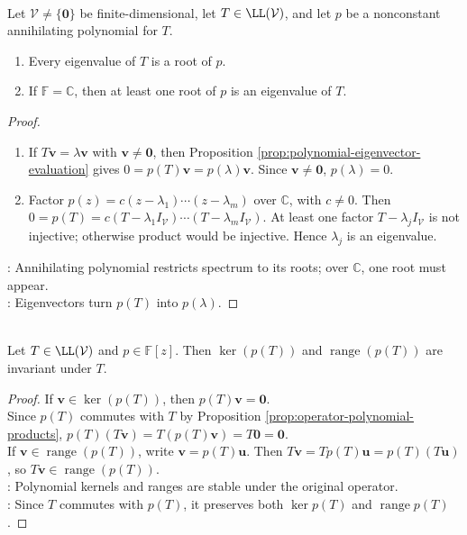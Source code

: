 \begin{theorem} \label{thm:annihilating-polynomials-control-spectrum} \\
Let $\mathcal{V}\neq\{\mathbf{0}\}$ be finite-dimensional, let $T\in\LL(\mathcal{V})$, and let $p$ be a nonconstant annihilating polynomial for $T$.
\begin{enumerate}[label=(\roman*)]
\setlength{\itemsep}{0pt}
\item Every eigenvalue of $T$ is a root of $p$.
\item If $\mathbb{F}=\mathbb{C}$, then at least one root of $p$ is an eigenvalue of $T$.
\end{enumerate}
\begin{proof}
\begin{enumerate}[label=(\roman*)]
\setlength{\itemsep}{0pt}
\item If $T\mathbf{v}=\lambda\mathbf{v}$ with $\mathbf{v}\neq\mathbf{0}$, then Proposition \ref{prop:polynomial-eigenvector-evaluation} gives $0=p(T)\mathbf{v}=p(\lambda)\mathbf{v}$. Since $\mathbf{v}\neq\mathbf{0}$, $p(\lambda)=0$.
\item Factor $p(z)=c(z-\lambda_1)\cdots(z-\lambda_m)$ over $\mathbb{C}$, with $c\neq0$. Then $0=p(T)=c(T-\lambda_1I_{\mathcal{V}})\cdots(T-\lambda_mI_{\mathcal{V}})$. At least one factor $T-\lambda_jI_{\mathcal{V}}$ is not injective; otherwise product would be injective. Hence $\lambda_j$ is an eigenvalue.
\end{enumerate}
: Annihilating polynomial restricts spectrum to its roots; over $\mathbb{C}$, one root must appear.\\
: Eigenvectors turn $p(T)$ into $p(\lambda)$.
\end{proof}
\end{theorem}

\begin{proposition} \label{prop:kernel-range-polynomial-in-operator-invariant} \label{prop:kernel-of-polynomial-in-operator-is-invariant} \\
Let $T\in\LL(\mathcal{V})$ and $p\in\mathbb{F}[z]$. Then $\ker(p(T))$ and $\operatorname{range}(p(T))$ are invariant under $T$.
\begin{proof}
If $\mathbf{v}\in\ker(p(T))$, then $p(T)\mathbf{v}=\mathbf{0}$.\\
Since $p(T)$ commutes with $T$ by Proposition \ref{prop:operator-polynomial-products}, $p(T)(T\mathbf{v})=T(p(T)\mathbf{v})=T\mathbf{0}=\mathbf{0}$.\\
If $\mathbf{v}\in\operatorname{range}(p(T))$, write $\mathbf{v}=p(T)\mathbf{u}$. Then $T\mathbf{v}=Tp(T)\mathbf{u}=p(T)(T\mathbf{u})$, so $T\mathbf{v}\in\operatorname{range}(p(T))$.\\
: Polynomial kernels and ranges are stable under the original operator.\\
: Since $T$ commutes with $p(T)$, it preserves both $\ker p(T)$ and $\operatorname{range}p(T)$.
\end{proof}
\end{proposition}

